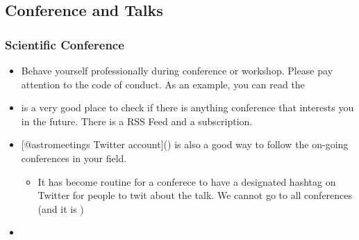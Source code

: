\documentclass[letterpaper,10pt,english]{sphinxmanual}
\begin{document}
\subsection{Conference and Talks}
\label{\detokenize{resource/research/getting_started:conference-and-talks}}

\subsubsection{Scientific Conference}
\label{\detokenize{resource/research/getting_started:scientific-conference}}\begin{itemize}
\item {} 
Behave yourself professionally during conference or workshop. Please
pay attention to the code of conduct. As an example, you can read the

\item {} 
is a very good place to check if there is anything conference that
interests you in the future. There is a RSS Feed and a 
subscription.

\item {} 
{[}@astromeetings Twitter
account{]}() is also a good
way to follow the on-going conferences in your field.
\begin{itemize}
\item {} 
It has become routine for a conferece to have a designated hashtag
on Twitter for people to twit about the talk. We cannot go to all
conferences (and it is )

\end{itemize}

\item {} 

\end{itemize}
\end{document}
